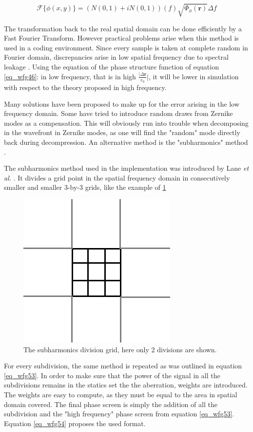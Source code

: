 \documentclass{article}
\begin{document}
\begin{equation}
\mathcal{F}\{ \phi(x,y)\} =  \left( N(0,1) + i N(0,1) \right)(f) \sqrt{\Phi_{\phi}(\textbf{r})} \Delta f 
\label{eq_wfg53}
\end{equation}

The transformation back to the real spatial domain can be done efficiently by a Fast Fourier Transform. However practical problems arise when this method is used in a coding environment. Since every sample is taken at complete random in Fourier domain, discrepancies arise in low spatial frequency due to spectral leakage \cite{lane1992simulation}. Using the equation of the phase structure function of equation \ref{eq_wfg46}: in low frequency, that is in high $\frac{| \Delta \textbf{r}}{r_0}|$, it will be lower in simulation with respect to the theory proposed in high frequency.

Many solutions have been proposed to make up for the error arising in the low frequency domain. Some have tried to introduce random draws from Zernike modes as a compensation. This will obviously run into trouble when decomposing in the wavefront in Zernike modes, as one will find the "random" mode directly back during decompression. An alternative method is the "subharmonics" method \cite{zernikeCircle}. %

The subharmonics method used in the implementation was introduced by Lane \textit{et al.}  \cite{lane1992simulation}. It divides a grid point in the spatial frequency domain in consecutively smaller and smaller 3-by-3 grids, like the example of \ref{fig_wfg04}

\newpage
\begin{figure}[H]
	\center
	\includegraphics[height=.5\textwidth, height=.3\textwidth]{Figures/subharmonics.png}
	\caption{The subharmonics division grid, here only 2 divisions are shown.}
	\label{fig_wfg04}
\end{figure}

For every subdivision, the same method is repeated as was outlined in equation \ref{eq_wfg53}. In order to make sure that the power of the signal in all the subdivisions remains in the statics set the the aberration, weights are introduced. The weights are easy to compute, as they must be equal to the area in spatial domain covered. The final phase screen is simply the addition of all the subdivision and the "high frequency" phase screen from equation \ref{eq_wfg53}. Equation \ref{eq_wfg54} proposes the used format.
\end{document}
